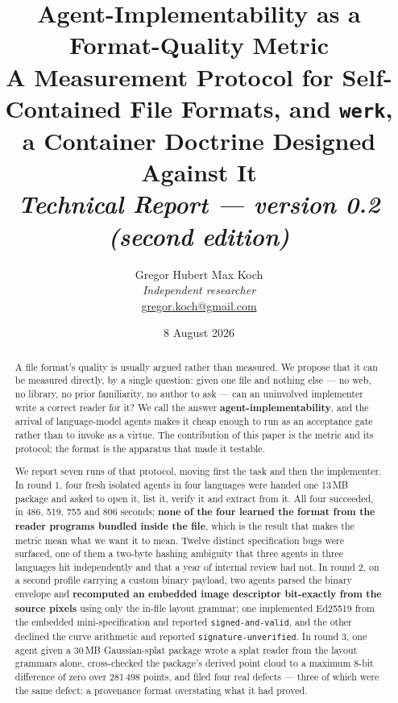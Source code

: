 \documentclass[10pt,twocolumn,letterpaper]{article}
\title{%
  \vspace{-2.0em}
  {\bfseries\huge Agent-Implementability as a Format-Quality Metric}\\[0.35em]
  {\large A Measurement Protocol for Self-Contained File Formats, and \texttt{werk},
   a Container Doctrine Designed Against It}\\[0.5em]
  {\normalsize\itshape Technical Report --- version 0.2 (second edition)}%
}
\author{%
  Gregor Hubert Max Koch\\
  {\small\itshape Independent researcher}\\
  {\small\href{mailto:gregor.koch@gmail.com}{gregor.koch@gmail.com}}%
}
\date{8 August 2026}
\newcommand{\code}[1]{\texttt{\small #1}}
\begin{document}
\maketitle

\begin{abstract}
\noindent
A file format's quality is usually argued rather than measured. We propose that it can be measured directly, by a single question: given one file and nothing else --- no web, no library, no prior familiarity, no author to ask --- can an uninvolved implementer write a correct reader for it? We call the answer \textbf{agent-implementability}, and the arrival of language-model agents makes it cheap enough to run as an acceptance gate rather than to invoke as a virtue. The contribution of this paper is the metric and its protocol; the format is the apparatus that made it testable.

We report seven runs of that protocol, moving first the task and then the implementer. In round 1, four fresh isolated agents in four languages were handed one 13\,MB package and asked to open it, list it, verify it and extract from it. All four succeeded, in 486, 519, 755 and 806 seconds; \textbf{none of the four learned the format from the reader programs bundled inside the file}, which is the result that makes the metric mean what we want it to mean. Twelve distinct specification bugs were surfaced, one of them a two-byte hashing ambiguity that three agents in three languages hit independently and that a year of internal review had not. In round 2, on a second profile carrying a custom binary payload, two agents parsed the binary envelope and \textbf{recomputed an embedded image descriptor bit-exactly from the source pixels} using only the in-file layout grammar; one implemented Ed25519 from the embedded mini-specification and reported \code{signed-and-valid}, and the other declined the curve arithmetic and reported \code{signature-unverified}. In round 3, one agent given a 30\,MB Gaussian-splat package wrote a splat reader from the layout grammars alone, cross-checked the package's derived point cloud to a maximum 8-bit difference of zero over 281\,498 points, and filed four real defects --- three of which were the same defect: a provenance format overstating what it had proved.


\end{abstract}
\end{document}
